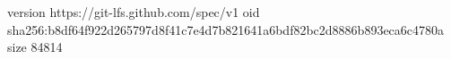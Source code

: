 version https://git-lfs.github.com/spec/v1
oid sha256:b8df64f922d265797d8f41c7e4d7b821641a6bdf82bc2d8886b893eca6c4780a
size 84814
